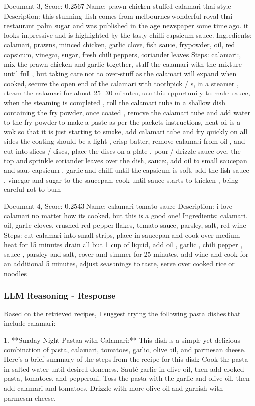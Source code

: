 \documentclass[a4paper,11pt]{article}
\begin{document}
Document 3, Score: 0.2567
Name: prawn chicken stuffed calamari thai style
Description: this stunning dish comes from melbournes wonderful royal thai restaurant palm sugar and was published in the age newspaper some time ago.  it looks impressive and is highlighted by the tasty chilli capsicum sauce.
Ingredients: calamari, prawns, minced chicken, garlic clove, fish sauce, frypowder, oil, red capsicum, vinegar, sugar, fresh chili peppers, coriander leaves
Steps: calamari:, mix the prawn chicken and garlic together, stuff the calamari with the mixture until full , but taking care not to over-stuff as the calamari will expand when cooked, secure the open end of the calamari with toothpick / s, in a steamer , steam the calamari for about 25- 30 minutes, use this opportunity to make sauce, when the steaming is completed , roll the calamari tube in a shallow dish containing the fry powder, once coated , remove the calamari tube and add water to the fry powder to make a paste as per the packets instructions, heat oil is a wok so that it is just starting to smoke, add calamari tube and fry quickly on all sides the coating should be a light , crisp batter, remove calamari from oil , and cut into slices / discs, place the discs on a plate , pour / drizzle sauce over the top and sprinkle coriander leaves over the dish, sauce:, add oil to small saucepan and saut capsicum , garlic and chilli until the capsicum is soft, add the fish sauce , vinegar and sugar to the saucepan, cook until sauce starts to thicken , being careful not to burn

Document 4, Score: 0.2543
Name: calamari tomato sauce
Description: i love calamari no matter how its cooked, but this is a good one!
Ingredients: calamari, oil, garlic cloves, crushed red pepper flakes, tomato sauce, parsley, salt, red wine
Steps: cut calamari into small strips, place in saucepan and cook over medium heat for 15 minutes drain all but 1 cup of liquid, add oil , garlic , chili pepper , sauce , parsley and salt, cover and simmer for 25 minutes, add wine and cook for an additional 5 minutes, adjust seasonings to taste, serve over cooked rice or noodles

\subsubsection{LLM Reasoning - Response}
Based on the retrieved recipes, I suggest trying the following pasta dishes that include calamari:

1. **Sunday Night Pastaa with Calamari:** This dish is a simple yet delicious combination of pasta, calamari, 
tomatoes, garlic, olive oil, and parmesan cheese. Here's a brief summary of the steps from the recipe for this dish:
Cook the pasta in salted water until desired doneness. Sauté garlic in olive oil, then add cooked pasta, tomatoes, 
and pepperoni. Toss the pasta with the garlic and olive oil, then add calamari and tomatoes. Drizzle with more olive oil and garnish with parmesan cheese.
\end{document}
